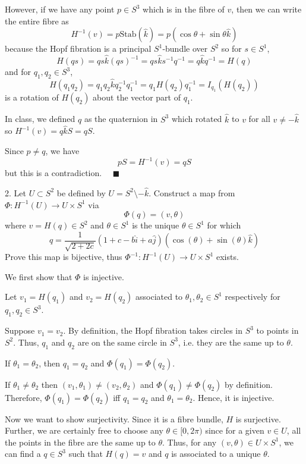 \documentclass[12pt]{article}
\newcommand{\lra}{\longrightarrow}
\newcommand{\qed}{\quad \blacksquare}
\newcommand{\khat}{\hat k}
\begin{document}
        However, if we have any point $p \in S^3$ which is in the fibre of $v$, then we can write the entire fibre as 
        \[H^{-1}(v) = p \text{Stab}(\khat) = p(\cos \theta + \sin \theta \khat)\] 
        because the Hopf fibration is a principal $S^1$-bundle over $S^2$ so for $s \in S^1$, 
        \[H(qs) = qs\khat (qs)^{-1} = qs\khat s^{-1}q^{-1} = q\khat q^{-1} = H(q)\]
        and for $q_1, q_2 \in S^3$, 
        \[H(q_1 q_2) = q_1 q_2 \khat q_2^{-1} q_1^{-1} = q_1H(q_2)q_1^{-1} = I_{q_1}(H(q_2))\]
        is a rotation of $H(q_2)$ about the vector part of $q_1$. 

        In class, we defined $q$ as the quaternion in $S^3$ which rotated $\khat$ to $v$ for all $v \neq -\khat$ so $H^{-1}(v) = q\khat S = qS$. 

        Since $p \neq q$, we have 
        \[pS = H^{-1}(v) = qS\]
        but this is a contradiction. $\qed$ 
    \color{black}


\pagebreak

2.  Let $U \subset S^{2}$ be defined by $U = S^{2}\setminus -\hat{k}$.  Construct a map from $\Phi:  H^{-1}(U) \lra U\times S^{1}$ via 
\[\Phi(q) = \left(v, \theta\right)\]
where $v = H(q) \in S^{2}$ and $\theta \in S^{1}$ is the unique $\theta \in S^{1}$ for which 
\[q = \frac{1}{\sqrt{2+2c}}\left(1 + c - b\hat{i} + a \hat{j}\right)\left(\cos(\theta) + \sin(\theta)\hat{k}\right)\]
Prove this map is bijective, thus $\Phi^{-1} : H^{-1}(U) \lra U\times S^{1}$ exists.

    \color{blue}
        We first show that $\Phi$ is injective.

        Let $v_1 = H(q_1)$ and $v_2 = H(q_2)$ associated to $\theta_1, \theta_2 \in S^1$ respectively for $q_1, q_2 \in S^3$. 

        Suppose $v_1 = v_2$. By definition, the Hopf fibration takes circles in $S^3$ to points in $S^2$. Thus, $q_1$ and $q_2$ are on the same circle in $S^3$, i.e. they are the same up to $\theta$. 
        
        If $\theta_1 = \theta_2$, then $q_1 = q_2$ and $\Phi(q_1) = \Phi(q_2)$.

        If $\theta_1 \neq \theta_2$ then $(v_1, \theta_1) \neq (v_2, \theta_2)$ and $\Phi(q_1) \neq \Phi(q_2)$ by definition. Therefore, $\Phi(q_1) = \Phi(q_2)$ iff $q_1 = q_2$ and $\theta_1 = \theta_2$. Hence, it is injective. 

        Now we want to show surjectivity. Since it is a fibre bundle, $H$ is surjective. Further, we are certainly free to choose any $\theta \in [0, 2\pi)$ since for a given $v \in U$, all the points in the fibre are the same up to $\theta$. Thus, for any $(v, \theta) \in U \times S^1$, we can find a $q \in S^3$ such that $H(q) = v$ and $q$ is associated to a unique $\theta$. 
\end{document}
